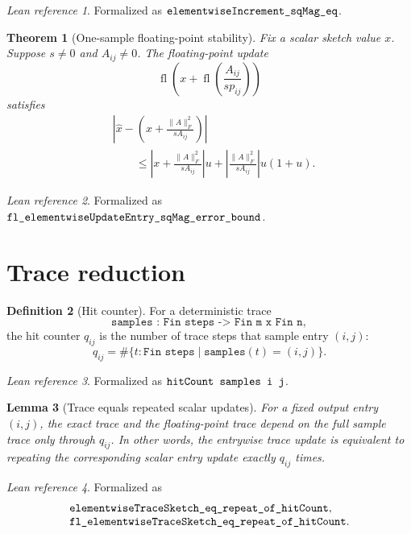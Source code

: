 \documentclass[11pt]{article}
\newcommand{\fl}{\operatorname{fl}}
\newcommand{\Frob}[1]{\lVert #1\rVert_F}
\newcommand{\lean}[1]{\texttt{\detokenize{#1}}}
\newtheorem{theorem}{Theorem}
\newtheorem{lemma}[theorem]{Lemma}
\theoremstyle{definition}
\newtheorem{definition}[theorem]{Definition}
\theoremstyle{remark}
\newtheorem*{leanref}{Lean reference}
\begin{document}
\begin{leanref}
Formalized as \(\lean{elementwiseIncrement_sqMag_eq}\).
\end{leanref}

\begin{theorem}[One-sample floating-point stability]
Fix a scalar sketch value \(x\). Suppose \(s \ne 0\) and \(A_{ij} \ne 0\).
The floating-point update
\[
  \fl\left(x + \fl\left(\frac{A_{ij}}{s p_{ij}}\right)\right)
\]
satisfies
\[
\begin{aligned}
&\left|
  \widehat x -
  \left(x + \frac{\Frob{A}^2}{s A_{ij}}\right)
\right| \\
&\qquad\le
  \left|x + \frac{\Frob{A}^2}{s A_{ij}}\right|u
  +
  \left|\frac{\Frob{A}^2}{s A_{ij}}\right|u(1+u).
\end{aligned}
\]
\end{theorem}

\begin{leanref}
Formalized as \(\lean{fl_elementwiseUpdateEntry_sqMag_error_bound}\).
\end{leanref}

\section*{Trace reduction}

\begin{definition}[Hit counter]
For a deterministic trace
\[
  \texttt{samples : Fin steps -> Fin m x Fin n},
\]
the hit counter \(q_{ij}\) is the number of trace steps that sample entry
\((i,j)\):
\[
  q_{ij} =
  \#\{t : \texttt{Fin steps} \mid \texttt{samples}(t)=(i,j)\}.
\]
\end{definition}

\begin{leanref}
Formalized as \(\lean{hitCount samples i j}\).
\end{leanref}

\begin{lemma}[Trace equals repeated scalar updates]
For a fixed output entry \((i,j)\), the exact trace and the floating-point trace
depend on the full sample trace only through \(q_{ij}\). In other words, the
entrywise trace update is equivalent to repeating the corresponding scalar
entry update exactly \(q_{ij}\) times.
\end{lemma}

\begin{leanref}
Formalized as
\[
\begin{array}{l}
  \lean{elementwiseTraceSketch_eq_repeat_of_hitCount},\\
  \lean{fl_elementwiseTraceSketch_eq_repeat_of_hitCount}.
\end{array}
\]
\end{leanref}
\end{document}
